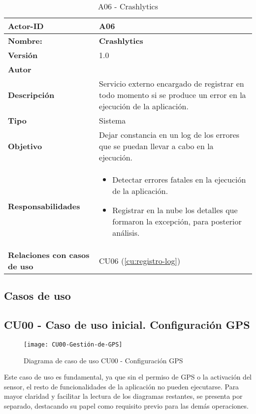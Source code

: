 \begin{table}[H]
	\centering
	\begin{tabularx}{\linewidth}{ p{} p{} }
		\toprule
		\textbf{Actor-ID}    & A06 \\
		\toprule
		\textbf{Nombre: }			  & \textbf{Crashlytics} \\
		\textbf{Versión}              & 1.0    \\
		\textbf{Autor}                & \autor \\
		\textbf{Descripción}          & Servicio externo encargado de registrar en todo momento si se produce un error en la ejecución de la aplicación. \\
		\textbf{Tipo}                 & Sistema \\
		\textbf{Objetivo}             & Dejar constancia en un log de los errores que se puedan llevar a cabo en la ejecución. \\
		\textbf{Responsabilidades}    & 
		\begin{itemize}
			\tightlist
			\item Detectar errores fatales en la ejecución de la aplicación.
			\item Registrar en la nube los detalles que formaron la excepción, para posterior análisis.
		\end{itemize}\\
		\textbf{Relaciones con casos de uso} & CU06 (\ref{cu:registro-log}) \\
		\bottomrule
	\end{tabularx}
	\caption{A06 - Crashlytics}
		\label{actor:crashlytics}
\end{table}
\subsection{Casos de uso}
\label{subsec:casos-uso}
\subsection{CU00 - Caso de uso inicial. Configuración GPS}
\begin{figure}[H]
	\centering
	\texttt{[image: CU00-Gestión-de-GPS]}
	\caption{Diagrama de caso de uso CU00 - Configuración GPS}
	\label{fig:CU00-Gestión-de-GPS}
\end{figure}

Este caso de uso es fundamental, ya que sin el permiso de GPS o la activación del sensor, el resto de funcionalidades de la aplicación no pueden ejecutarse. Para mayor claridad y facilitar la lectura de los diagramas restantes, se presenta por separado, destacando su papel como requisito previo para las demás operaciones.

